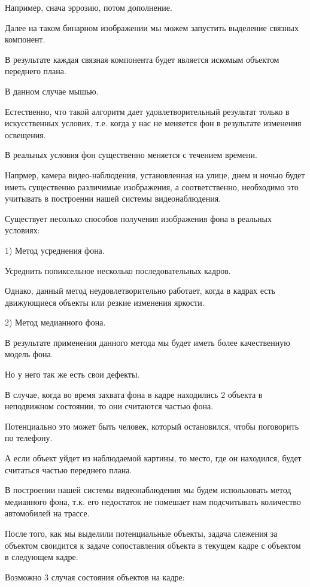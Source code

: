 \documentclass[12pt,a4paper,oneside,titlepage]{article}
\begin{document}
Например, снача эррозию, потом дополнение.

Далее на таком бинарном изображении мы можем запустить выделение связных компонент.

В результате каждая связная компонента будет является искомым объектом переднего плана.

В данном случае мышью.

Естественно, что такой алгоритм дает удовлетворительный результат только в искусственных услових, т.е. когда у нас не меняется фон в результате изменения освещения.

В реальных условия фон существенно меняется с течением времени.

Напрмер, камера видео-наблюдения, установленная на улице, днем и ночью будет иметь существенно различимые изображения, а соответственно, необходимо это учитывать в построенни нашей системы видеонаблюдения.

Существует несолько способов получения изображения фона в реальных условиях:

1) Метод усреднения фона.

Усреднить попиксельное несколько последовательных кадров.

Однако, данный метод неудовлетворительно работает, когда в кадрах есть движующиеся объекты или резкие изменения яркости.

2) Метод медианного фона.

В результате применения данного метода мы будет иметь более качественную модель фона.

Но у него так же есть свои дефекты.

В случае, когда во время захвата фона в кадре находились 2 объекта в неподвижном состоянии, то они считаются частью фона.

Потенциально это может быть человек, который остановился, чтобы поговорить по телефону.

А если объект уйдет из наблюдаемой картины, то место, где он находился, будет считаться частью переднего плана.

В построении нашей системы видеонаблюдения мы будем использовать метод медианного фона, т.к. его недостаток не помешает нам подсчитывать количество автомобилей на трассе.

После того, как мы выделили потенциальные объекты, задача слежения за объектом своидится к задаче сопоставления объекта в текущем кадре с объектом в следующем кадре.

Возможно 3 случая состояния объектов на кадре:
\end{document}
